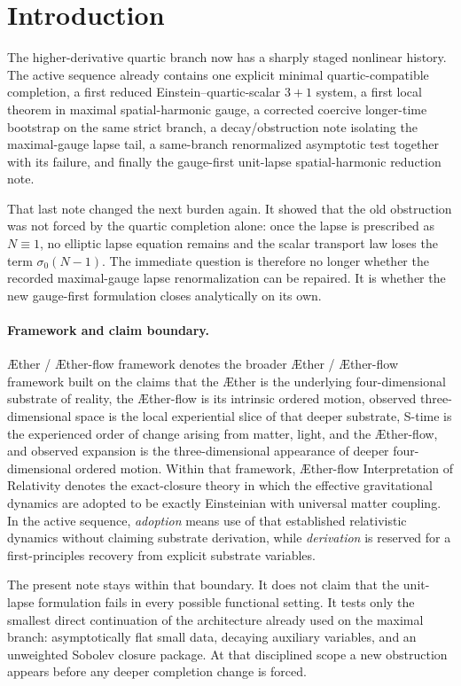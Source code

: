 \documentclass[11pt]{article}
\newcommand{\Aether}{\AE{}ther}
\newcommand{\Aflow}{\AE{}ther-flow}
\newcommand{\TheoryName}{\Aflow{} Interpretation of Relativity}
\newcommand{\TheoryProgram}{\Aether{} / \Aflow{} framework}
\begin{document}
\section{Introduction}

The higher-derivative quartic branch now has a sharply staged nonlinear history. The active sequence already contains one explicit minimal quartic-compatible completion, a first reduced Einstein--quartic-scalar \(3+1\) system, a first local theorem in maximal spatial-harmonic gauge, a corrected coercive longer-time bootstrap on the same strict branch, a decay/obstruction note isolating the maximal-gauge lapse tail, a same-branch renormalized asymptotic test together with its failure, and finally the gauge-first unit-lapse spatial-harmonic reduction note.

That last note changed the next burden again. It showed that the old obstruction was not forced by the quartic completion alone: once the lapse is prescribed as \(N\equiv 1\), no elliptic lapse equation remains and the scalar transport law loses the term \(\sigma_0(N-1)\). The immediate question is therefore no longer whether the recorded maximal-gauge lapse renormalization can be repaired. It is whether the new gauge-first formulation closes analytically on its own.

\paragraph{Framework and claim boundary.}
\TheoryProgram{} denotes the broader \Aether{} / \Aflow{} framework built on the claims that the \Aether{} is the underlying four-dimensional substrate of reality, the \Aflow{} is its intrinsic ordered motion, observed three-dimensional space is the local experiential slice of that deeper substrate, S-time is the experienced order of change arising from matter, light, and the \Aflow{}, and observed expansion is the three-dimensional appearance of deeper four-dimensional ordered motion. Within that framework, \TheoryName{} denotes the exact-closure theory in which the effective gravitational dynamics are adopted to be exactly Einsteinian with universal matter coupling. In the active sequence, \emph{adoption} means use of that established relativistic dynamics without claiming substrate derivation, while \emph{derivation} is reserved for a first-principles recovery from explicit substrate variables.

The present note stays within that boundary. It does not claim that the unit-lapse formulation fails in every possible functional setting. It tests only the smallest direct continuation of the architecture already used on the maximal branch: asymptotically flat small data, decaying auxiliary variables, and an unweighted Sobolev closure package. At that disciplined scope a new obstruction appears before any deeper completion change is forced.
\end{document}

